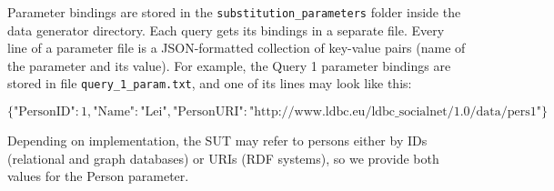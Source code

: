 Parameter bindings are stored in the \texttt{substitution\_parameters} folder
inside the data generator directory. Each query gets its bindings in a separate
file. Every line of a parameter file is a JSON-formatted collection of
key-value pairs (name of the parameter and its value). For example, the Query 1
parameter bindings are stored in file \texttt{query\_1\_param.txt}, and one of
its lines may look like this:

\vspace{-6mm}
$$
\{\text{"PersonID"}: 1, \text{"Name"}: \text{"Lei"}, \text{"PersonURI"}: \text{"http://www.ldbc.eu/ldbc\_socialnet/1.0/data/pers1"}\}
$$

Depending on implementation, the SUT may refer to persons either
by IDs (relational and graph databases) or URIs (RDF systems), so we provide
both values for the Person parameter.
